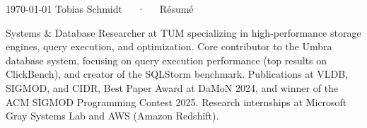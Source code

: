 \documentclass[11pt, a4paper]{awesome-cv}
\newcommand{\vspacestretch}{-1mm}
\begin{document}
\makecvheader[C]

\makecvfooter
{\today}
{Tobias Schmidt~~~·~~~Résumé}
{\thepage}



\vspace{1.5mm}
\begin{center}
  \begin{minipage}{0.95\textwidth}
    \begin{cvparagraph}
      Systems \& Database Researcher at TUM specializing in high-performance storage engines, query execution, and optimization.
      Core contributor to the Umbra database system, focusing on query execution performance (top results on ClickBench), and creator of the SQLStorm benchmark.
      Publications at VLDB, SIGMOD, and CIDR, Best Paper Award at DaMoN 2024, and winner of the ACM SIGMOD Programming Contest 2025.
      Research internships at Microsoft Gray Systems Lab and AWS (Amazon Redshift).
    \end{cvparagraph}
  \end{minipage}
\end{center}



\vspace{\vspacestretch}

\vspace{\vspacestretch}

\newpage

\vspace{\vspacestretch}

\vspace{\vspacestretch}


\end{document}
